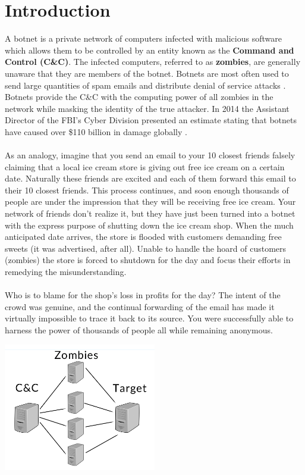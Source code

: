 \pagebreak

\section{Introduction}

A botnet is a private network of computers infected with malicious software which allows them to be controlled by an entity known as the \textbf{Command and Control (C\&C)}.
The infected computers, referred to as \textbf{zombies}, are generally unaware that they are members of the botnet.
Botnets are most often used to send large quantities of spam emails and distribute denial of service attacks \cite{kapersky}.
Botnets provide the C\&C with the computing power of all zombies in the network while masking the identity of the true attacker.
In 2014 the Assistant Director of the FBI's Cyber Division presented an estimate stating that botnets have caused over
\$110 billion in damage globally \cite{fbi}.
\\ \\
As an analogy, imagine that you send an email to your 10 closest friends falsely claiming that a local ice cream store
is giving out free ice cream on a certain date.  Naturally these friends are excited and each of them forward this email
to their 10 closest friends.  This process continues, and soon enough thousands of people are under the impression
that they will be receiving free ice cream.
Your network of friends don't realize it, but they have just been turned into a botnet with the express purpose of shutting down the ice cream shop.
When the much anticipated date arrives, the store is flooded with customers demanding free sweets (it was advertised, after all).
Unable to handle the hoard of customers (zombies) the store is forced to shutdown for the day and focus their efforts in remedying the misunderstanding.
\\ \\
Who is to blame for the shop's loss in profits for the day?  The intent of the crowd was genuine,
and the continual forwarding of the email has made it virtually impossible to trace
it back to its source.  You were successfully able to harness the power of thousands
of people all while remaining anonymous.

\begin{center}
  \includegraphics[width=0.5\textwidth]{assets/botnet_example.png}
  \label{fig:botnet_example}
\end{center}

